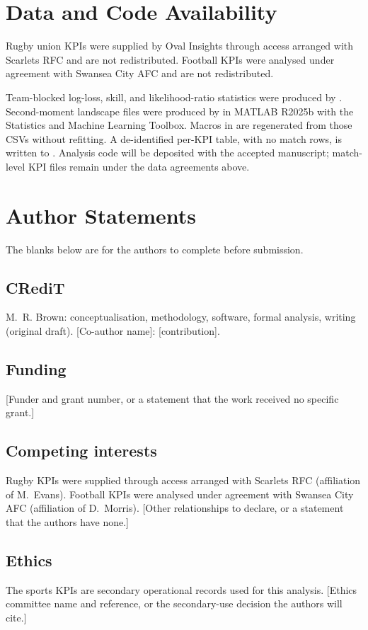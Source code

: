 \section{Data and Code Availability}
\label{sec:data_availability}

Rugby union KPIs were supplied by Oval Insights through access arranged with Scarlets RFC and are not redistributed.
Football KPIs were analysed under agreement with Swansea City AFC and are not redistributed.

Team-blocked log-loss, skill, and likelihood-ratio statistics were produced by .
Second-moment landscape files were produced by  in {MATLAB} {R2025b} with the Statistics and Machine Learning Toolbox.
Macros in  are regenerated from those CSVs without refitting.
A de-identified per-KPI table, with no match rows, is written to .
Analysis code will be deposited with the accepted manuscript; match-level KPI files remain under the data agreements above.

\section{Author Statements}
\label{sec:author_statements}

The blanks below are for the authors to complete before submission.

\subsection{CRediT}

M.~R. Brown: conceptualisation, methodology, software, formal analysis, writing (original draft). [Co-author name]: [contribution].

\subsection{Funding}

[Funder and grant number, or a statement that the work received no specific grant.]

\subsection{Competing interests}

Rugby KPIs were supplied through access arranged with Scarlets RFC (affiliation of M.~Evans).
Football KPIs were analysed under agreement with Swansea City AFC (affiliation of D.~Morris).
[Other relationships to declare, or a statement that the authors have none.]

\subsection{Ethics}

The sports KPIs are secondary operational records used for this analysis. [Ethics committee name and reference, or the secondary-use decision the authors will cite.]
